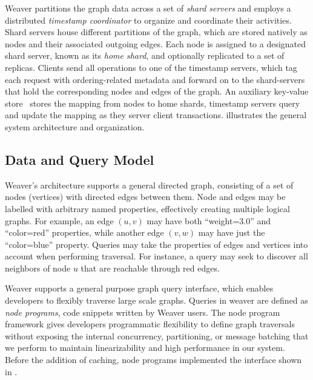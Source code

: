 \documentclass[letterpaper,twocolumn,11pt,tight]{article}
\begin{document}
Weaver partitions the graph data across a set of 
    {\em shard servers} and employs a distributed {\em timestamp coordinator} to
    organize and coordinate their activities.
Shard servers house different partitions of the graph, which are stored
    natively as nodes and their associated outgoing edges. Each node is 
    assigned to a designated shard server, known as its {\em home shard}, 
    and optionally replicated to a set of replicas.
Clients send all operations to one of the timestamp servers, which tag each request with ordering-related
    metadata and forward on to the shard-servers that hold the corresponding
    nodes and edges of the graph. 
An auxiliary key-value store~\cite{warp} stores the mapping from nodes to home shards,
    timestamp servers query and update the mapping as they server client
    transactions.
 illustrates the general system architecture and organization.


\subsection{Data and Query Model}

Weaver's architecture supports a general directed graph, consisting of a set of
    nodes (vertices) with directed edges between them.
Node and edges may be labelled with arbitrary named properties, effectively
    creating multiple logical graphs.
For example, an edge $(u,v)$ may have both ``weight=3.0'' and ``color=red'' properties,
    while another edge $(v,w)$ may have just the ``color=blue'' property.
Queries may take the properties of edges and vertices into account when
    performing traversal. For instance, a query may seek to discover all 
neighbors of node $u$ that are reachable through red edges.

Weaver supports a general purpose graph query interface, which enables developers to flexibly traverse large scale graphs.
Queries in weaver are defined as {\em node programs}, code snippets written by Weaver users.
The node program framework gives developers programmatic flexibility to define graph traversals
without exposing the internal concurrency, partitioning, or message batching that we perform to maintain linearizability and high performance in our system.
Before the addition of caching, node programs implemented the interface shown in .
\end{document}
